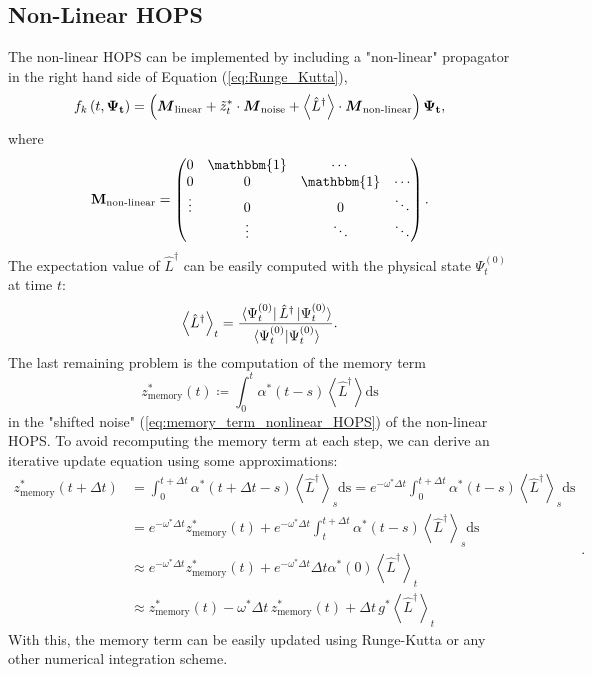 \subsection*{Non-Linear HOPS}
The non-linear HOPS can be implemented by including a "non-linear" propagator in the right hand side of Equation (\ref{eq:Runge_Kutta}),
\begin{equation*}
    f_k\left(t, \vb{\Psi_t}\right) = \left(\vb*{M}_\text{linear} + \tilde{z}_t^* \cdot \vb*{M}_\text{noise} + \left\langle \hat{L}^\dagger\right\rangle \cdot \vb*{M}_\text{non-linear}\right) \vb{\Psi_t},
\end{equation*}
where
\begin{equation*}
    \vb{M}_\text{non-linear} = 
    \begin{pmatrix}
        0      & \mathbbm{1} & \cdots     &        \\
        0      & 0          & \mathbbm{1} & \cdots \\
        \vdots & 0          & 0          & \ddots \\
               & \vdots & \ddots & \ddots \\
    \end{pmatrix}.
\end{equation*}
The expectation value of $\hat{L}^\dagger$ can be easily computed with the physical state $\Psi_t^{(0)}$ at time $t$:
\begin{equation*}
    \left\langle \hat{L}^\dagger \right\rangle_t = \frac{\bra*{\Psi^{(0)}_t}\hat{L}^\dagger\ket*{\Psi^{(0)}_t}}{\bra*{\Psi^{(0)}_t}\ket*{\Psi^{(0)}_t}}.
\end{equation*}
The last remaining problem is the computation of the memory term
\begin{equation*}
    z^*_{\text{memory}} (t) \coloneqq \int_0^t \alpha^*(t-s) \left\langle
        \hat{L}^\dagger
        \right\rangle \text{ds}
\end{equation*}
in the "shifted noise" (\ref{eq:memory_term_nonlinear_HOPS}) of the non-linear HOPS. To avoid recomputing the memory term
at each step, we can derive an iterative update equation using some approximations:
\begin{equation}
    \label{eq:memory_update_single_bath_node}
    \begin{split}
        z^*_\text{memory}(t+\Delta t) &= \int_0^{t+\Delta t}\alpha^*(t+\Delta t-s)\left\langle \hat{L}^{\dagger}\right\rangle_s\text{ds} = e^{-\omega^*\Delta t} \int_0^{t+\Delta t}\alpha^*(t-s)\left\langle \hat{L}^{\dagger}\right\rangle_s\text{ds} \\
        &= e^{-\omega^*\Delta t} z^*_\text{memory}(t) + e^{-\omega^*\Delta t} \int_t^{t+\Delta t}\alpha^*(t-s)\left\langle \hat{L}^{\dagger}\right\rangle_s\text{ds} \\
        &\approx e^{-\omega^*\Delta t} z^*_\text{memory}(t) + e^{-\omega^*\Delta t} \Delta t \alpha^*(0) \left\langle \hat{L}^{\dagger}\right\rangle_t \\
        &\approx z^*_\text{memory}(t) - \omega^*\Delta t \, z^*_\text{memory}(t) + \Delta t \, g^* \left\langle \hat{L}^{\dagger}\right\rangle_t
    \end{split}.
\end{equation}
With this, the memory term can be easily updated using Runge-Kutta or any other numerical integration scheme. 